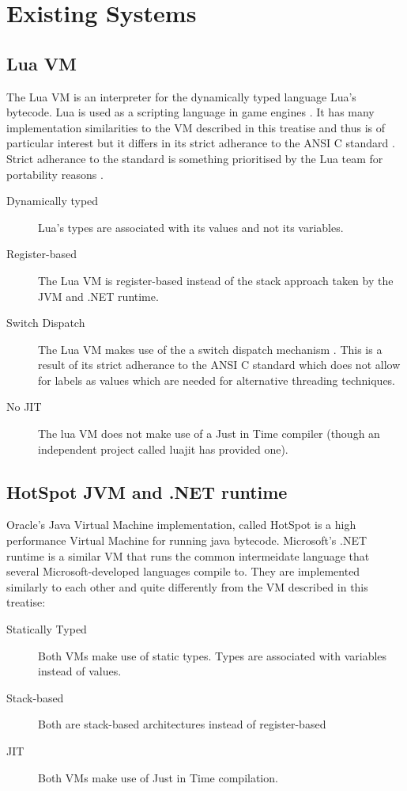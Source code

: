 \documentclass[english,a4paper]{report}
\begin{document}
\section{Existing Systems}

\subsection{Lua VM}

The Lua VM is an interpreter for the dynamically typed language Lua's
bytecode. Lua is used as a scripting language in game engines
\cite{LuaUsed}. It has many implementation similarities to the VM
described in this treatise and thus is of particular interest but it
differs in its strict adherance to the ANSI C standard
\cite{RobertoIerusalimschy}. Strict adherance to the standard is
something prioritised by the Lua team for portability reasons
\cite{RobertoIerusalimschy}.
\begin{description}
\item[Dynamically typed] Lua's types are associated with its values
  and not its variables.
\item[Register-based] The Lua VM is register-based instead of the
  stack approach taken by the JVM and .NET runtime.
\item[Switch Dispatch] The Lua VM makes use of the a switch dispatch
  mechanism \cite{Lua.Source}. This is a result of its strict
  adherance to the ANSI C standard which does not allow for labels as
  values which are needed for alternative threading techniques.
\item[No JIT] The lua VM does not make use of a Just in Time compiler
  (though an independent project called luajit has provided one).
\end{description}

\subsection{HotSpot JVM and .NET runtime}
Oracle's Java Virtual Machine implementation, called HotSpot is a
high performance Virtual Machine for running java
bytecode. Microsoft's .NET runtime is a similar VM that runs the
common intermeidate language that several Microsoft-developed
languages compile to. They are implemented similarly to each other and
quite differently from the VM described in this treatise:
\begin{description}
\item[Statically Typed] Both VMs make use of static types. Types are
  associated with variables instead of values.
\item[Stack-based] Both are stack-based architectures instead of
  register-based
\item[JIT] Both VMs make use of Just in Time compilation.
\end{description}
\end{document}
